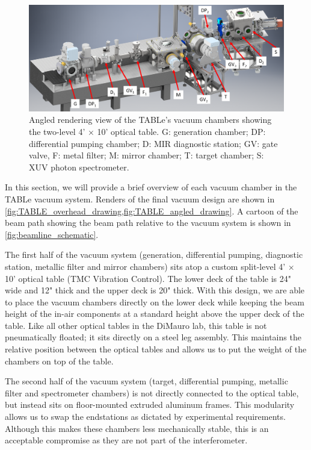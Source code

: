 \begin{figure}
	\centering
	\includegraphics[width=1.0\textwidth]{figures/chap2/TABLe assembly - angled labeled.png}
	\caption{Angled rendering view of the TABLe's vacuum chambers showing the two-level 4' $\times$ 10' optical table. G: generation chamber; DP: differential pumping chamber; D: MIR diagnostic station; GV: gate valve, F: metal filter; M: mirror chamber; T: target chamber; S: XUV photon spectrometer.}
	\label{fig:TABLE_angled_drawing}
\end{figure}


In this section, we will provide a brief overview of each vacuum chamber in the TABLe vacuum system. Renders of the final vacuum design are shown in \cref{fig:TABLE_overhead_drawing,fig:TABLE_angled_drawing}. A cartoon of the beam path showing the beam path relative to the vacuum system is shown in \cref{fig:beamline_schematic}.

The first half of the vacuum system (generation, differential pumping, diagnostic station,  metallic filter and mirror chambers) sits atop a custom split-level 4' $\times$ 10' optical table (TMC Vibration Control). The lower deck of the table is 24" wide and 12" thick and the upper deck is 20" thick. With this design, we are able to place the vacuum chambers directly on the lower deck while keeping the beam height of the in-air components at a standard height above the upper deck of the table. Like all other optical tables in the DiMauro lab, this table is not pneumatically floated; it sits directly on a steel leg assembly. This maintains the relative position between the optical tables and allows us to put the weight of the chambers on top of the table.

The second half of the vacuum system (target, differential pumping,  metallic filter and spectrometer chambers) is not directly connected to the optical table, but instead sits on floor-mounted extruded aluminum frames. This modularity allows us to swap the endstations as dictated by experimental requirements. Although this makes these chambers less mechanically stable, this is an acceptable compromise as they are not part of the interferometer.

